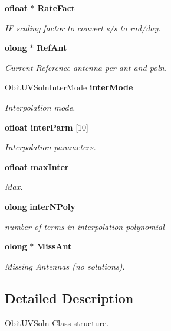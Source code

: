 \begin{CompactItemize}
{\bf ofloat} $\ast$ {\bf Rate\-Fact}
\begin{CompactList}\small\item\em IF scaling factor to convert s/s to rad/day. \item\end{CompactList}\item 
{\bf olong} $\ast$ {\bf Ref\-Ant}
\begin{CompactList}\small\item\em Current Reference antenna per ant and poln. \item\end{CompactList}\item 
Obit\-UVSoln\-Inter\-Mode {\bf inter\-Mode}
\begin{CompactList}\small\item\em Interpolation mode. \item\end{CompactList}\item 
{\bf ofloat} {\bf inter\-Parm} [10]
\begin{CompactList}\small\item\em Interpolation parameters. \item\end{CompactList}\item 
{\bf ofloat} {\bf max\-Inter}
\begin{CompactList}\small\item\em Max. \item\end{CompactList}\item 
{\bf olong} {\bf inter\-NPoly}
\begin{CompactList}\small\item\em number of terms in interpolation polynomial \item\end{CompactList}\item 
{\bf olong} $\ast$ {\bf Miss\-Ant}
\begin{CompactList}\small\item\em Missing Antennas (no solutions). \item\end{CompactList}\end{CompactItemize}


\subsection{Detailed Description}
Obit\-UVSoln Class structure. 



